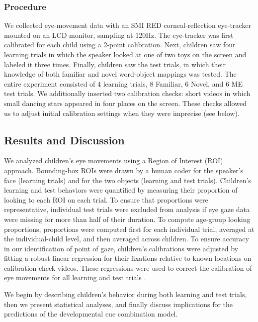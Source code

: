 \documentclass[man,floatsintext]{apa6}
\begin{document}
\subsubsection{Procedure}

We collected eye-movement data with an SMI RED corneal-reflection eye-tracker mounted on an LCD monitor, sampling at 120Hz. The eye-tracker was first calibrated for each child using a 2-point calibration. Next, children saw four learning trials in which the speaker looked at one of two toys on the screen and labeled it three times. Finally, children saw the test trials, in which their knowledge of both familiar and novel word-object mappings was tested. The entire experiment consisted of 4 learning trials, 8 Familiar, 6 Novel, and 6 ME test trials. We additionally inserted two calibration checks: short videos in which small dancing stars appeared in four places on the screen.  These checks allowed us to adjust initial calibration settings when they were imprecise (see below).

\subsection{Results and Discussion}

We analyzed children's eye movements using a Region of Interest (ROI) approach. Bounding-box ROIs were drawn by a human coder for the speaker's face (learning trials) and for the two objects (learning and test trials). Children's learning and test behaviors were quantified by measuring their proportion of looking to each ROI on each trial. To ensure that proportions were representative, individual test trials were excluded from analysis if eye gaze data were missing for more than half of their duration. To compute age-group looking proportions, proportions were computed first for each individual trial, averaged at the individual-child level, and then averaged across children. To ensure accuracy in our identification of point of gaze, children's calibrations were adjusted by fitting a robust linear regression for their fixations relative to known locations on calibration check videos. These regressions were used to correct the calibration of eye movements for all learning and test trials \cite{Frank2012d}.

We begin by describing children's behavior during both learning and test trials, then we present statistical analyses, and finally discuss implications for the predictions of the developmental cue combination model. 
\end{document}
